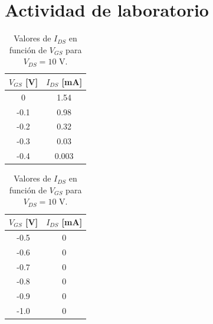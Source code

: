 \documentclass[chaptersright]{informeutn}
\begin{document}
\section{Actividad de laboratorio}
\begin{table}[h!]
    \centering
    \begin{minipage}{0.45\linewidth}
        \centering
        \begin{tabular}{c c}
            \toprule
            $V_{GS}$ [V] & $I_{DS}$ [mA] \\
            \midrule
            0    & 1.54  \\
            -0.1 & 0.98  \\
            -0.2 & 0.32  \\
            -0.3 & 0.03  \\
            -0.4 & 0.003 \\
            \bottomrule
        \end{tabular}
    \end{minipage}%
    \hspace{0.05\linewidth}
    \begin{minipage}{0.45\linewidth}
        \centering
        \begin{tabular}{c c}
            \toprule
            $V_{GS}$ [V] & $I_{DS}$ [mA] \\
            \midrule
            -0.5 & 0     \\
            -0.6 & 0     \\
            -0.7 & 0     \\
            -0.8 & 0     \\
            -0.9 & 0     \\
            -1.0 & 0     \\
            \bottomrule
        \end{tabular}
    \end{minipage}
    \caption{Valores de $I_{DS}$ en función de $V_{GS}$ para $V_{DS}=10$ V.}
\end{table}
\end{document}

